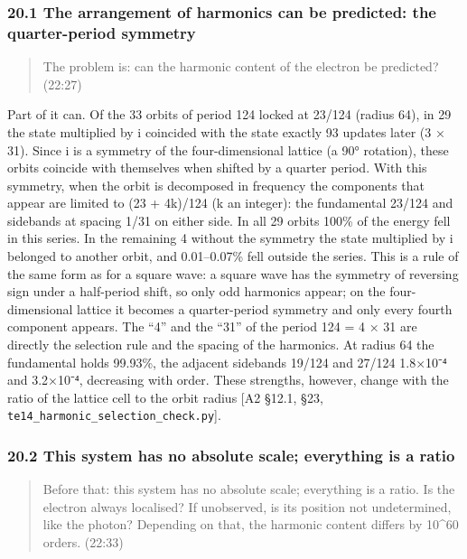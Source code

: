 \documentclass[
  a4paper,
]{article}
\begin{document}
\subsubsection{20.1 The arrangement of harmonics can be predicted: the
quarter-period
symmetry}\label{the-arrangement-of-harmonics-can-be-predicted-the-quarter-period-symmetry}

\begin{quote}
The problem is: can the harmonic content of the electron be predicted?
(22:27)
\end{quote}

Part of it can. Of the 33 orbits of period 124 locked at 23/124 (radius
64), in 29 the state multiplied by i coincided with the state exactly 93
updates later (3 × 31). Since i is a symmetry of the four-dimensional
lattice (a 90° rotation), these orbits coincide with themselves when
shifted by a quarter period. With this symmetry, when the orbit is
decomposed in frequency the components that appear are limited to (23 +
4k)/124 (k an integer): the fundamental 23/124 and sidebands at spacing
1/31 on either side. In all 29 orbits 100\% of the energy fell in this
series. In the remaining 4 without the symmetry the state multiplied by
i belonged to another orbit, and 0.01--0.07\% fell outside the series.
This is a rule of the same form as for a square wave: a square wave has
the symmetry of reversing sign under a half-period shift, so only odd
harmonics appear; on the four-dimensional lattice it becomes a
quarter-period symmetry and only every fourth component appears. The
``4'' and the ``31'' of the period 124 = 4 × 31 are directly the
selection rule and the spacing of the harmonics. At radius 64 the
fundamental holds 99.93\%, the adjacent sidebands 19/124 and 27/124
1.8×10⁻⁴ and 3.2×10⁻⁴, decreasing with order. These strengths, however,
change with the ratio of the lattice cell to the orbit radius {[}A2
§12.1, §23, \texttt{te14\_\allowbreak{}harmonic\_\allowbreak{}selection\_\allowbreak{}check.py}{]}.

\subsubsection{20.2 This system has no absolute scale; everything is a
ratio}\label{this-system-has-no-absolute-scale-everything-is-a-ratio}

\begin{quote}
Before that: this system has no absolute scale; everything is a ratio.
Is the electron always localised? If unobserved, is its position not
undetermined, like the photon? Depending on that, the harmonic content
differs by 10\^{}60 orders. (22:33)
\end{quote}
\end{document}
